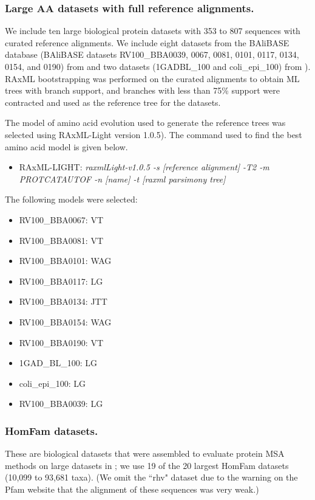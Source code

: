 \subsubsection{Large AA datasets with full reference alignments.}\label{balibase_dataset}
We include ten large biological protein datasets with 353 to 
807 sequences with curated reference alignments.  
We include eight datasets from the BAliBASE database 
(BAliBASE datasets RV100\_BBA0039, 0067, 0081, 0101, 0117, 0134, 0154, and 0190) from \cite{Thompson2011} and two datasets 
(1GADBL\_100 and coli\_epi\_100) from \cite{Gloor2005}).  RAxML bootstrapping was performed on the curated alignments to obtain ML trees with branch support, and branches with less than 75\% support were contracted and used as the reference tree for the datasets.  

The model of amino acid evolution used to generate the reference trees was selected using RAxML-Light \cite{Stamatakis2012} version 1.0.5).  The command used to find the best amino acid model is given below.
\begin{itemize}
\item RAxML-LIGHT: \emph{raxmlLight-v1.0.5 -s [reference alignment] -T2 -m PROTCATAUTOF -n [name] -t [raxml parsimony tree]}
\end{itemize}

The following models were selected:
\begin{itemize}
\item RV100\_BBA0067: VT
\item RV100\_BBA0081: VT
\item RV100\_BBA0101: WAG
\item RV100\_BBA0117: LG
\item RV100\_BBA0134: JTT
\item RV100\_BBA0154: WAG
\item RV100\_BBA0190: VT
\item 1GAD\_BL\_100: LG
\item coli\_epi\_100: LG
\item RV100\_BBA0039: LG
\end{itemize}




\subsubsection{HomFam datasets.}  
These are biological datasets that were assembled
to evaluate protein MSA methods on large datasets in \cite{Sievers2011};
we use 19 of the 20 largest HomFam datasets (10,099 to 93,681 taxa).
(We omit the ``rhv" dataset due to the warning on the Pfam website
that the alignment of these sequences was very weak.) 

